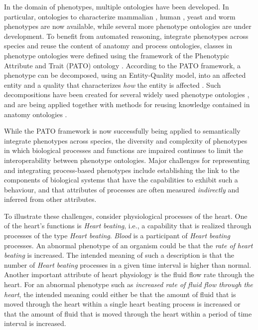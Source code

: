 \documentclass[12pt]{article}
\renewcommand{\cite}{\citep}
\begin{document}
In the domain of phenotypes, multiple ontologies have been
developed. In particular, ontologies to characterize mammalian
\cite{Smith2004}, human \cite{Robinson2008}, yeast \cite{ypo} and worm
\cite{wpo} phenotypes are now available, while several more phenotype
ontologies are under development. To benefit from automated reasoning,
integrate phenotypes across species and reuse the content of anatomy
and process ontologies, classes in phenotype ontologies were defined
using the framework of the Phenotypic Attribute and Trait (PATO)
ontology \cite{Gkoutos2005}. According to the PATO framework, a
phenotype can be decomposed, using an Entity-Quality model, into an
affected entity and a quality that characterizes {\em how} the entity
is affected \cite{Gkoutos2005}. Such decompositions have been created
for several widely used phenotype ontologies \cite{Mungall2010,
  Gkoutos2009b, obml2011h1}, and are being applied together with
methods for reusing knowledge contained in anatomy ontologies
\cite{Mungall2010, Hoehndorf2010phene}.

While the PATO framework is now successfully being applied to
semantically integrate phenotypes across species, the diversity and
complexity of phenotypes in which biological processes and functions
are impaired continues to limit the interoperability between phenotype
ontologies. Major challenges for representing and integrating
process-based phenotypes include establishing the link to the
components of biological systems that have the capabilities to exhibit
such a behaviour, and that attributes of processes are often measured
{\em indirectly} and inferred from other attributes.

To illustrate these challenges, consider physiological processes of
the heart. One of the heart's functions is {\em Heart beating}, i.e.,
a capability that is realized through processes of the type {\em Heart
  beating}. {\em Blood} is a participant of {\em Heart beating}
processes.  An abnormal phenotype of an organism could be that the
{\em rate of heart beating} is increased. The intended meaning of such
a description is that the number of {\em Heart beating} processes in a
given time interval is higher than normal. Another important attribute
of heart physiology is the fluid flow rate through the heart. For an
abnormal phenotype such as {\em increased rate of fluid flow through
  the heart}, the intended meaning could either be that the amount of
fluid that is moved through the heart within a single heart beating
process is increased or that the amount of fluid that is moved through
the heart within a period of time interval is increased. 
\end{document}
